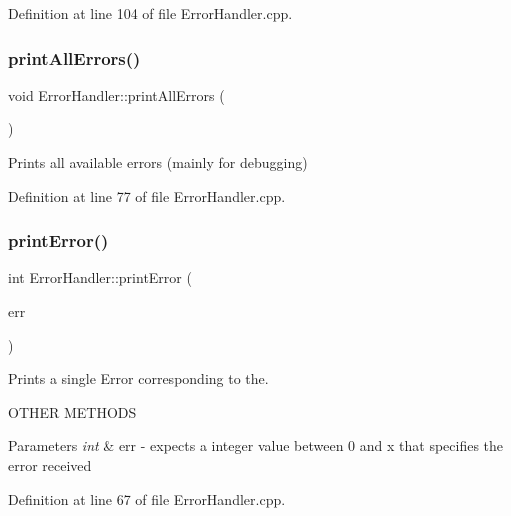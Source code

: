 Definition at line 104 of file Error\+Handler.\+cpp.

\mbox{\label{classErrorHandler_a1108324c221544c928a2de3a2cf9ba98}} 
\subsubsection{\texorpdfstring{printAllErrors()}{printAllErrors()}}
{\footnotesize\ttfamily void Error\+Handler\+::print\+All\+Errors (\begin{DoxyParamCaption}\item[{void}]{ }\end{DoxyParamCaption})}



Prints all available errors (mainly for debugging) 



Definition at line 77 of file Error\+Handler.\+cpp.

\mbox{\label{classErrorHandler_ab90b8248f24e3129df69d224585956dd}} 
\subsubsection{\texorpdfstring{printError()}{printError()}\hspace{0.1cm}{\footnotesize\ttfamily [1/2]}}
{\footnotesize\ttfamily int Error\+Handler\+::print\+Error (\begin{DoxyParamCaption}\item[{int}]{err }\end{DoxyParamCaption})}



Prints a single Error corresponding to the. 

O\+T\+H\+ER M\+E\+T\+H\+O\+DS
\begin{DoxyParams}{Parameters}
{\em int} & err -\/ expects a integer value between 0 and x that specifies the error received \\
\hline
\end{DoxyParams}


Definition at line 67 of file Error\+Handler.\+cpp.

